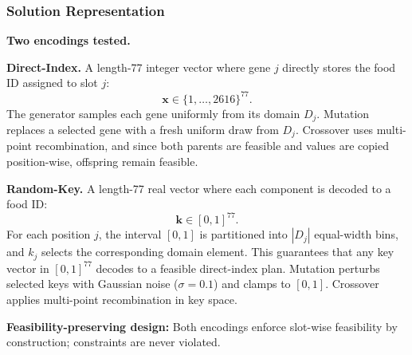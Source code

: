 \documentclass[aspectratio=169,10pt]{beamer}
\begin{document}
\begin{frame}
\frametitle{Solution Representation}

\textbf{Two encodings tested.}

\vspace{0.2cm}

\textbf{Direct-Index.} A length-77 integer vector where gene $j$ directly stores the food ID assigned to slot $j$:
\[
\mathbf{x} \in \{1, \ldots, 2616\}^{77}.
\]
The generator samples each gene uniformly from its domain $D_j$. Mutation replaces a selected gene with a fresh uniform draw from $D_j$. Crossover uses multi-point recombination, and since both parents are feasible and values are copied position-wise, offspring remain feasible.

\vspace{0.3cm}

\textbf{Random-Key.} A length-77 real vector where each component is decoded to a food ID:
\[
\mathbf{k} \in [0,1]^{77}.
\]
For each position $j$, the interval $[0,1]$ is partitioned into $|D_j|$ equal-width bins, and $k_j$ selects the corresponding domain element. This guarantees that any key vector in $[0,1]^{77}$ decodes to a feasible direct-index plan. Mutation perturbs selected keys with Gaussian noise ($\sigma = 0.1$) and clamps to $[0,1]$. Crossover applies multi-point recombination in key space.

\vspace{0.2cm}

\textbf{Feasibility-preserving design:} Both encodings enforce slot-wise feasibility by construction; constraints are never violated.

\end{frame}
\end{document}
